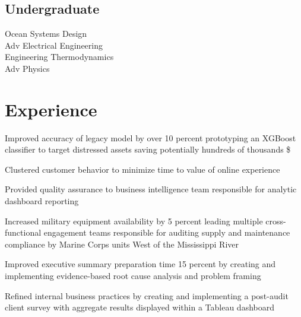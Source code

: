 \documentclass[]{Forester-Resume}
\begin{document}
\begin{minipage}[t]{0.33\textwidth}
\sectionsep
\subsection{Undergraduate}
Ocean Systems Design \\
Adv Electrical Engineering\\
Engineering Thermodynamics \\
Adv Physics \\

%
%

\end{minipage} 
\hfill
\begin{minipage}[t]{0.66\textwidth} 

\section{Experience}
\vspace{\topsep} %
\begin{tightemize}
\item Improved accuracy of legacy model by over 10 percent  prototyping an XGBoost classifier to target distressed assets saving potentially hundreds of thousands \$
\item Clustered customer behavior to minimize time to value of online experience  
\item Provided quality assurance to business intelligence team responsible for analytic dashboard reporting
\end{tightemize}
\sectionsep

\begin{tightemize}
\item Increased military equipment availability by 5 percent leading multiple cross-functional engagement teams responsible for auditing supply and maintenance compliance by Marine Corps units West of the Mississippi River
\item Improved executive summary preparation time 15 percent by creating and implementing evidence-based root cause analysis and problem framing   
\item Refined internal business practices by creating and implementing a post-audit client survey with aggregate results displayed within a Tableau dashboard 
\end{tightemize}
\sectionsep


\end{minipage}
\end{document}
